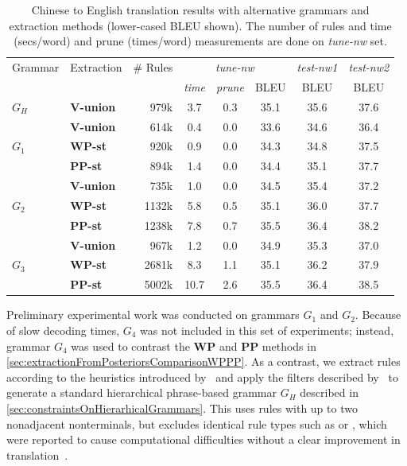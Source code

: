 \begin{table}
  \begin{center}
    \begin{footnotesize}
    \begin{tabular}{|l|l|r||c|c|c||c||c|}
      \hline
      Grammar & Extraction & \# Rules & \multicolumn{3}{c||}{{\em tune-nw}} & {\em test-nw1} & {\em test-nw2} \\  \cline{4-8}
      &        &    & {\em time} & {\em prune} & BLEU & BLEU & BLEU \\ \hline
      $G_H$ & {\bf V-union} & 979k & 3.7 & 0.3 & 35.1 & 35.6 & 37.6  \\
      \hline
      & {\bf V-union} & 614k & 0.4 & 0.0 & 33.6 & 34.6 & 36.4  \\
      $G_1$ & {\bf WP-st} & 920k & 0.9 & 0.0  & 34.3 & 34.8 & 37.5  \\
      & {\bf PP-st} & 894k & 1.4 & 0.0 & 34.4 & 35.1 & 37.7   \\
      \hline
      & {\bf V-union} & 735k & 1.0 & 0.0 & 34.5  & 35.4  & 37.2   \\
      $G_2$ & {\bf WP-st} & 1132k & 5.8 & 0.5 & 35.1 & 36.0  & 37.7   \\
      & {\bf PP-st} & 1238k & 7.8 & 0.7 & 35.5 & 36.4  & 38.2   \\
      \hline
      & {\bf V-union} & 967k & 1.2 & 0.0 & 34.9 & 35.3  & 37.0   \\
      $G_3$ & {\bf WP-st} & 2681k & 8.3 & 1.1 & 35.1  & 36.2  & 37.9   \\
      & {\bf PP-st} & 5002k & 10.7 &  2.6  & 35.5 & 36.4  & 38.5  \\
      \hline
    \end{tabular}
    \end{footnotesize}
    \caption{Chinese to English translation results with alternative grammars and extraction methods (lower-cased BLEU shown). The number of rules and time (secs/word) and prune (times/word) measurements are done on {\em tune-nw} set.}
    \label{tab:extractionFromPosteriorsTranslationResults}
  \end{center}
\end{table}
%
Preliminary experimental work
was conducted on grammars $G_1$ and $G_2$.
Because of slow decoding times, $G_4$ was not included in this set
of experiments; instead, grammar $G_4$ was used to contrast the \textbf{WP}
and \textbf{PP} methods in \autoref{sec:extractionFromPosteriorsComparisonWPPP}.
As a contrast, we extract rules according to the heuristics introduced
by~\citet{chiang:2007:CL} and apply the filters described
by~\citet{iglesias-degispert-banga-byrne:2009:EACL} to generate a standard
hierarchical phrase-based grammar $G_H$ described in
\autoref{sec:constraintsOnHierarhicalGrammars}.
This uses rules with up to two nonadjacent
nonterminals, but excludes identical rule types such as \RT[$X$][$w~X$][$w~X$]
or \RT[$X$][$w~X_1~w~X_2$][$w~X_1~w~X_2$], which were reported to cause
computational difficulties without a clear improvement in
translation~\citep{iglesias-degispert-banga-byrne:2009:EACL}. 

